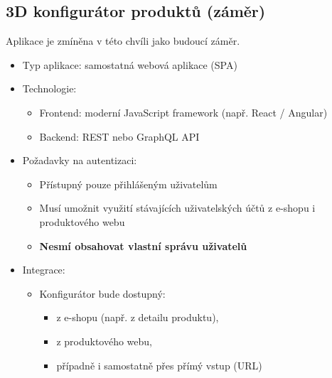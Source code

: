 \documentclass[a4paper,12pt]{article}
\begin{document}
\subsection{3D konfigurátor produktů (záměr)}

Aplikace je zmíněna v této chvíli jako budoucí záměr.\par

\begin{itemize}

\item Typ aplikace: samostatná webová aplikace (SPA)

\item Technologie:\begin{itemize}

\item Frontend: moderní JavaScript framework (např. React / Angular)

\item Backend: REST nebo GraphQL API

\end{itemize}



\item Požadavky na autentizaci:\begin{itemize}

\item Přístupný pouze přihlášeným uživatelům

\item Musí umožnit využití stávajících uživatelských účtů z e-shopu i produktového webu

\item \textbf{Nesmí obsahovat vlastní správu uživatelů}


\end{itemize}



\item Integrace:\begin{itemize}

\item Konfigurátor bude dostupný:\begin{itemize}

\item z e-shopu (např. z detailu produktu),

\item z produktového webu,

\item případně i samostatně přes přímý vstup (URL)

\end{itemize}



\end{itemize}



\end{itemize}
\end{document}

